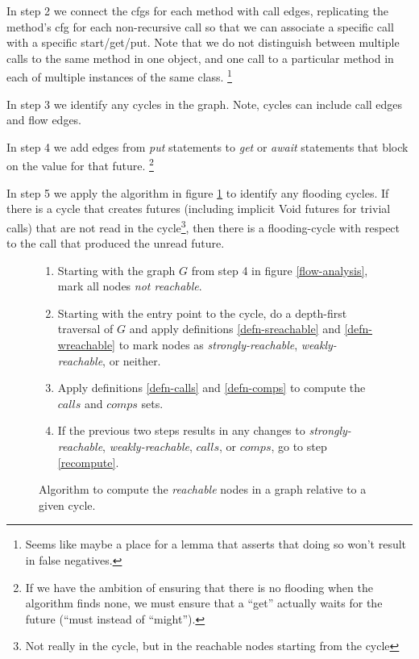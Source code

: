 \documentclass[12pt]{article}%
\begin{document}
In step 2 we connect the cfgs for each method with call edges, replicating the method's cfg for each non-recursive call so that we can
associate a specific call with a specific start/get/put. Note that we do not distinguish between multiple calls to the same method in one
object, and one call to a particular method in each of multiple instances of the same class. 
\footnote{Seems like maybe a place for a lemma that asserts that doing so won't result in false negatives.}

In step 3 we identify any cycles in the graph. Note, cycles can include call edges and flow edges.

In step 4 we add edges from \emph{put} statements to \emph{get} or \emph{await} statements that block on the value for that future.
\footnote{If we have the ambition of ensuring that 
there is no flooding when the algorithm finds none,
we must ensure that a ``get'' actually waits for the future
(``must instead of ``might'').}

In step 5 we apply the algorithm in figure \ref{reachable-analysis} to identify any flooding cycles.
If there is a cycle that creates futures (including implicit Void futures for trivial calls) that are not read
in the cycle\footnote{Not really in the cycle, but in the reachable nodes starting from the cycle}, 
then there is a flooding-cycle with respect to the call that produced the unread future. 


\begin{figure}
\begin{shaded}
\begin{enumerate}
\item Starting with the graph $G$ from step 4 in figure \ref{flow-analysis}, mark all nodes \emph{not reachable}.
\item \label{recompute} Starting with the entry point to the cycle, do a depth-first traversal of $G$ and apply definitions
\ref{defn-sreachable} and \ref{defn-wreachable} to mark nodes as \emph{strongly-reachable}, \emph{weakly-reachable}, or neither.
\item Apply definitions \ref{defn-calls} and \ref{defn-comps} to compute the $calls$ and $comps$ sets.
\item If the previous two steps results in any changes to \emph{strongly-reachable}, \emph{weakly-reachable}, $calls$, or $comps$, 
go to step \ref{recompute}.
\end{enumerate}
\end{shaded}
\caption{\label{reachable-analysis}
Algorithm to compute the \emph{reachable} nodes in a graph relative to a given cycle.}
\end{figure}
\end{document}

